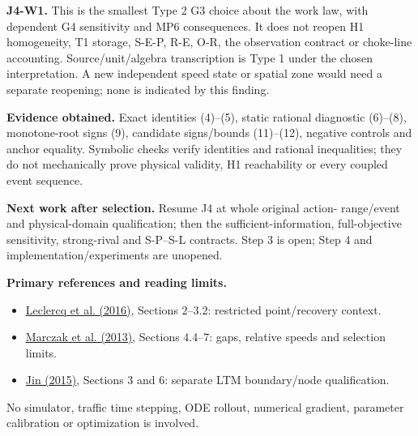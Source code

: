 \documentclass[11pt,a4paper]{article}
\begin{document}
\textbf{J4-W1.} This is the smallest Type 2 G3 choice about the work law,
with dependent G4 sensitivity and MP6 consequences. It does not reopen
H1 homogeneity, T1 storage, S-E-P, R-E, O-R, the observation contract or
choke-line accounting. Source/unit/algebra transcription is Type 1 under
the chosen interpretation. A new independent speed state or spatial zone
would need a separate reopening; none is indicated by this finding.

\textbf{Evidence obtained.} Exact identities (4)--(5), static rational
diagnostic (6)--(8), monotone-root signs (9), candidate signs/bounds
(11)--(12), negative controls and anchor equality. Symbolic checks verify
identities and rational inequalities; they do not mechanically prove
physical validity, H1 reachability or every coupled event sequence.

\textbf{Next work after selection.} Resume J4 at whole original action-
range/event and physical-domain qualification; then the sufficient-information,
full-objective sensitivity, strong-rival and S-P--S-L contracts. Step 3 is
open; Step 4 and implementation/experiments are unopened.

\textbf{Primary references and reading limits.}
\begin{itemize}
\item \href{https://repository.tudelft.nl/file/File_c424c1b3-7374-436b-a6a7-abdf69063aa6}{Leclercq et al. (2016)}, Sections 2--3.2: restricted point/recovery context.
\item \href{https://mocopo.ifsttar.fr/fileadmin/contributeurs/Mocopo/Documents/Other_documents/Article_-_Merging_behaviour_-_Empirical_comparison_between_two_sites_and_new_theory_development.pdf}{Marczak et al. (2013)}, Sections 4.4--7: gaps, relative speeds and selection limits.
\item \href{https://arxiv.org/pdf/1405.7080}{Jin (2015)}, Sections 3 and 6: separate LTM boundary/node qualification.
\end{itemize}
No simulator, traffic time stepping, ODE rollout, numerical gradient,
parameter calibration or optimization is involved.
\end{document}
